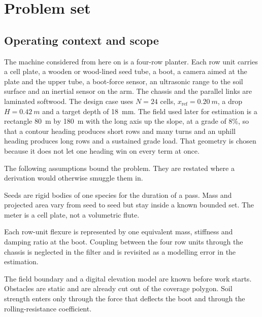 \section{Problem set}
\label{sec:problem}

\subsection{Operating context and scope}

The machine considered from here on is a four-row planter. Each row unit carries a cell plate, a wooden or wood-lined seed tube, a boot, a camera aimed at the plate and the upper tube, a boot-force sensor, an ultrasonic range to the soil surface and an inertial sensor on the arm. The chassis and the parallel links are laminated softwood. The design case uses \(N=24\) cells, \(x_{\mathrm{ref}}=\SI{0.20}{m}\), a drop \(H=\SI{0.42}{m}\) and a target depth of \SI{18}{mm}. The field used later for estimation is a rectangle \SI{80}{m} by \SI{180}{m} with the long axis up the slope, at a grade of \num{8}\%, so that a contour heading produces short rows and many turns and an uphill heading produces long rows and a sustained grade load. That geometry is chosen because it does not let one heading win on every term at once.

The following assumptions bound the problem. They are restated where a derivation would otherwise smuggle them in.

\begin{assumption}
\label{as:seed}
Seeds are rigid bodies of one species for the duration of a pass. Mass and projected area vary from seed to seed but stay inside a known bounded set. The meter is a cell plate, not a volumetric flute.
\end{assumption}

\begin{assumption}
\label{as:flex}
Each row-unit flexure is represented by one equivalent mass, stiffness and damping ratio at the boot. Coupling between the four row units through the chassis is neglected in the filter and is revisited as a modelling error in the estimation.
\end{assumption}

\begin{assumption}
\label{as:map}
The field boundary and a digital elevation model are known before work starts. Obstacles are static and are already cut out of the coverage polygon. Soil strength enters only through the force that deflects the boot and through the rolling-resistance coefficient.
\end{assumption}

